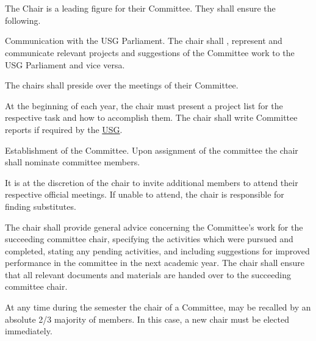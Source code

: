 \section{}
The Chair is a leading figure for their Committee. They shall ensure the following.
\begin{parenum}
\item Communication with the USG Parliament. The chair shall , represent and communicate relevant projects and suggestions of the Committee work to the USG Parliament and vice versa. 

\item The chairs shall preside over the meetings of their Committee.
\item At the beginning of each year, the chair must present a project list for the respective task and how to accomplish them. The chair shall write Committee reports if required by the \hyperref[USGdef]{USG}.

\item Establishment of the Committee. Upon assignment of the committee the chair shall nominate committee members. 

\item It is at the discretion of the chair to invite additional members to attend their respective official meetings. If unable to attend, the chair is responsible for finding substitutes.

\item The chair shall provide general advice concerning the Committee's work for the succeeding committee chair, specifying the activities which were pursued and completed, stating any pending activities, and including suggestions for improved performance in the committee in the next academic year. The chair shall ensure that all relevant documents and materials are handed over to the succeeding committee chair. 
\item At any time during the semester the chair of a Committee, may be recalled by an absolute 2/3 majority of members. In this case, a new chair must be elected immediately.
\end{parenum}


